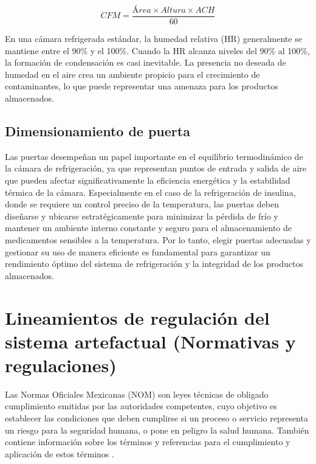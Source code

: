 \begin{equation}
	 {CFM} = \frac{ {Área} \times  {Altura} \times  {ACH}}{60}
\end{equation}

En una cámara refrigerada estándar, la humedad relativa (HR) generalmente se mantiene entre el 90\% y el 100\%. Cuando la HR alcanza niveles del 90\% al 100\%, la formación de condensación es casi inevitable. La presencia no deseada de humedad en el aire crea un ambiente propicio para el crecimiento de contaminantes, lo que puede representar una amenaza para los productos almacenados.
\subsection{Dimensionamiento de puerta}

Las puertas desempeñan un papel importante en el equilibrio termodinámico de la cámara de refrigeración, ya que representan puntos de entrada y salida de aire que pueden afectar significativamente la eficiencia energética y la estabilidad térmica de la cámara. Especialmente en el caso de la refrigeración de insulina, donde se requiere un control preciso de la temperatura, las puertas deben diseñarse y ubicarse estratégicamente para minimizar la pérdida de frío y mantener un ambiente interno constante y seguro para el almacenamiento de medicamentos sensibles a la temperatura. Por lo tanto, elegir puertas adecuadas y gestionar su uso de manera eficiente es fundamental para garantizar un rendimiento óptimo del sistema de refrigeración y la integridad de los productos almacenados. 
 
 
 

\section{Lineamientos de regulación del sistema artefactual (Normativas y regulaciones)}

Las Normas Oficiales Mexicanas (NOM) son leyes técnicas de obligado cumplimiento emitidas por las autoridades competentes, cuyo objetivo es establecer las condiciones que deben cumplirse si un proceso o servicio representa un riesgo para la seguridad humana, o pone en peligro la salud humana. También contiene información sobre los términos y referencias para el cumplimiento y aplicación de estos términos \cite{salud-2022}.
